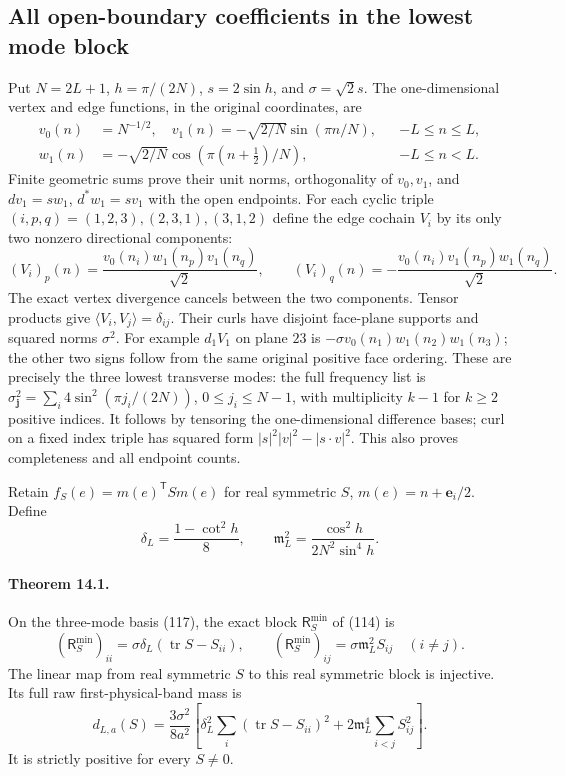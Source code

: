 \documentclass[11pt]{article}
\begin{document}
\subsection{All open-boundary coefficients in the lowest mode block}

Put $N=2L+1$, $h=\pi/(2N)$, $s=2\sin h$, and $\sigma=\sqrt2s$.
The one-dimensional vertex and edge functions, in the original
coordinates, are
\begin{align*}
 v_0(n)&=N^{-1/2},\quad
 v_1(n)=-\sqrt{2/N}\sin(\pi n/N), &&-L\le n\le L,\\
 w_1(n)&=-\sqrt{2/N}\cos(\pi(n+\tfrac12)/N), &&-L\le n<L.
\end{align*}
Finite geometric sums prove their unit norms, orthogonality of
$v_0,v_1$, and $dv_1=sw_1$, $d^*w_1=sv_1$ with the open endpoints.
For each cyclic triple $(i,p,q)=(1,2,3),(2,3,1),(3,1,2)$ define the
edge cochain $V_i$ by its only two nonzero directional components:
\begin{equation}\label{eq:low-modes}
 (V_i)_p(n)=\frac{v_0(n_i)w_1(n_p)v_1(n_q)}{\sqrt2},\qquad
 (V_i)_q(n)=-\frac{v_0(n_i)v_1(n_p)w_1(n_q)}{\sqrt2}.
\end{equation}
The exact vertex divergence cancels between the two components.
Tensor products give $\langle V_i,V_j\rangle=\delta_{ij}$.
Their curls have disjoint face-plane supports and squared norms $\sigma^2$.
For example $d_1V_1$ on plane $23$ is
$-\sigma v_0(n_1)w_1(n_2)w_1(n_3)$; the other two signs follow from
the same original positive face ordering. These are precisely the three
lowest transverse modes: the full frequency list is
$\sigma_{\mathbf j}^2=\sum_i4\sin^2(\pi j_i/(2N))$,
$0\le j_i\le N-1$, with multiplicity $k-1$ for $k\ge2$ positive indices.
It follows by tensoring the one-dimensional difference bases; curl on a
fixed index triple has squared form $|s|^2|v|^2-|s\cdot v|^2$.
This also proves completeness and all endpoint counts.

Retain $f_S(e)=m(e)^{\mathsf T}S m(e)$ for real symmetric $S$,
$m(e)=n+\mathbf e_i/2$. Define
\begin{equation}\label{eq:low-delta}
 \delta_L=\frac{1-\cot^2h}{8},\qquad
 \mathfrak m_L^2=\frac{\cos^2h}{2N^2\sin^4h}.
\end{equation}

\paragraph{Theorem 14.1.}
On the three-mode basis (117), the exact block
$\mathsf R_S^{\min}$ of (114) is
\begin{equation}\label{eq:low-block}
 (\mathsf R_S^{\min})_{ii}=\sigma\delta_L(\operatorname{tr}S-S_{ii}),
 \qquad
 (\mathsf R_S^{\min})_{ij}=\sigma\mathfrak m_L^2S_{ij}\quad(i\ne j).
\end{equation}
The linear map from real symmetric $S$ to this real symmetric block is
injective. Its full raw first-physical-band mass is
\begin{equation}\label{eq:low-d}
 d_{L,a}(S)=\frac{3\sigma^2}{8a^2}
 \left[
 \delta_L^2\sum_i(\operatorname{tr}S-S_{ii})^2+
 2\mathfrak m_L^4\sum_{i<j}S_{ij}^2
 \right].
\end{equation}
It is strictly positive for every $S\ne0$.
\end{document}
